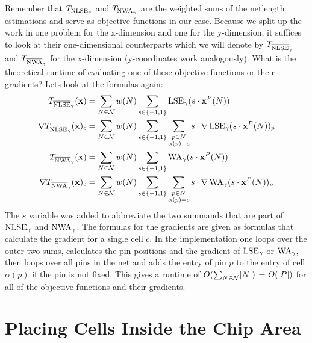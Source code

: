 Remember that \(T_{\operatorname{NLSE}_\gamma}\) and \(T_{\operatorname{NWA}_\gamma}\) are the weighted sums of the netlength estimations
and serve as objective functions in our case.
Because we split up the work in one problem for the x-dimension and one for the y-dimension,
it suffices to look at their one-dimensional counterparts which we will denote by
\(T_{\overline{\operatorname{NLSE}}_\gamma}\) and \(T_{\overline{\operatorname{NWA}}_\gamma}\) for the x-dimension (y-coordinates work analogously).
What is the theoretical runtime of evaluating one of these objective functions or their gradients?
Lets look at the formulas again:
\begin{align*}
 T_{\overline{\operatorname{NLSE}}_{\gamma}}(\mathbf{x})          &= \sum_{N \in \mathcal{N}} w(N) \sum_{s \in \{-1, 1\}} \operatorname{LSE}_{\gamma}(s \cdot \mathbf{x}^P(N)) \\
 \nabla T_{\overline{\operatorname{NLSE}}_{\gamma}}(\mathbf{x})_c &= \sum_{N \in \mathcal{N}} w(N) \sum_{s \in \{-1, 1\}} \sum_{\substack{p \in N \\ \alpha(p) = c}} s \cdot \nabla \operatorname{LSE}_\gamma(s \cdot \mathbf{x}^P(N))_p \\
 T_{\overline{\operatorname{NWA}}_{\gamma}}(\mathbf{x})           &= \sum_{N \in \mathcal{N}} w(N) \sum_{s \in \{-1, 1\}} \operatorname{WA}_{\gamma}(s \cdot \mathbf{x}^P(N)) \\
 \nabla T_{\overline{\operatorname{NWA}}_{\gamma}}(\mathbf{x})_c  &= \sum_{N \in \mathcal{N}} w(N) \sum_{s \in \{-1, 1\}} \sum_{\substack{p \in N \\ \alpha(p) = c}} s \cdot \nabla \operatorname{WA}_\gamma(s \cdot \mathbf{x}^P(N))_p
\end{align*}
The \(s\) variable was added to abbreviate the two summands that are part of \(\operatorname{NLSE}_\gamma\) and \(\operatorname{NWA}_\gamma\).
The formulas for the gradients are given as formulas that calculate the gradient for a single cell \(c\).
In the implementation one loops over the outer two sums,
calculates the pin positions and the gradient of \(\operatorname{LSE}_\gamma\) or \(\operatorname{WA}_\gamma\),
then loops over all pins in the net and adds the entry of pin \(p\) to the entry of cell \(\alpha(p)\)
if the pin is not fixed.
This gives a runtime of \(O(\sum_{N \in \mathcal{N}} \lvert N\rvert)\) = \(O(\lvert P\rvert)\) for all of the objective functions and their gradients.


\section{Placing Cells Inside the Chip Area} \label{sec:placing_cells_inside_chip_area}

